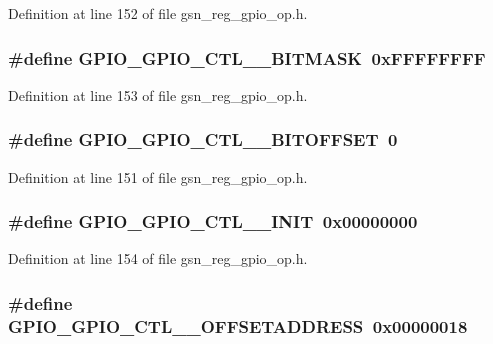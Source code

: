 Definition at line 152 of file gsn\_\-reg\_\-gpio\_\-op.h.

\hypertarget{a00553_a46e73f3281176c81ee18096d18b654bc}{
\subsubsection[{GPIO\_\-GPIO\_\-CTL\_\-1\_\-BITMASK}]{\setlength{\rightskip}{0pt plus 5cm}\#define GPIO\_\-GPIO\_\-CTL\_\_\-BITMASK~0xFFFFFFFF}}
\label{a00553_a46e73f3281176c81ee18096d18b654bc}


Definition at line 153 of file gsn\_\-reg\_\-gpio\_\-op.h.

\hypertarget{a00553_a66f6d7f5013e564a5ad67e4feeb35196}{
\subsubsection[{GPIO\_\-GPIO\_\-CTL\_\-1\_\-BITOFFSET}]{\setlength{\rightskip}{0pt plus 5cm}\#define GPIO\_\-GPIO\_\-CTL\_\_\-BITOFFSET~0}}
\label{a00553_a66f6d7f5013e564a5ad67e4feeb35196}


Definition at line 151 of file gsn\_\-reg\_\-gpio\_\-op.h.

\hypertarget{a00553_abf5aba2a58979ad93aee20628873c627}{
\subsubsection[{GPIO\_\-GPIO\_\-CTL\_\-1\_\-INIT}]{\setlength{\rightskip}{0pt plus 5cm}\#define GPIO\_\-GPIO\_\-CTL\_\_\-INIT~0x00000000}}
\label{a00553_abf5aba2a58979ad93aee20628873c627}


Definition at line 154 of file gsn\_\-reg\_\-gpio\_\-op.h.

\hypertarget{a00553_a7068ff42e1189e5781989b988c52a794}{
\subsubsection[{GPIO\_\-GPIO\_\-CTL\_\-1\_\-OFFSETADDRESS}]{\setlength{\rightskip}{0pt plus 5cm}\#define GPIO\_\-GPIO\_\-CTL\_\_\-OFFSETADDRESS~0x00000018}}
\label{a00553_a7068ff42e1189e5781989b988c52a794}


